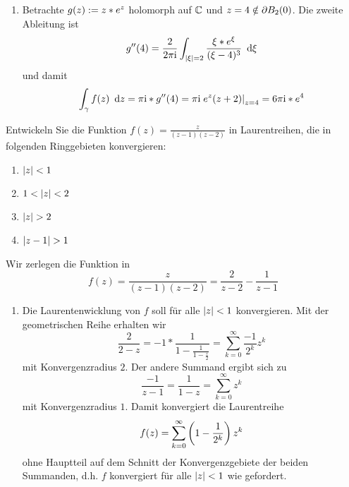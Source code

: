 \begin{exercisePage}
\begin{enumerate}[label=(zu \alph*), leftmargin=*]
		\item Betrachte $g(z) \mathrel{:=} z * e^z$ holomorph auf $\mathbb{C}$ und $z = 4 \notin \partial B_2(0)$. Die zweite Ableitung ist
		\begin{equation*}
			g''(4) = \frac{2}{2 \pi \mathrm{i}} \int_{\left| \xi \right| = 2} \frac{\xi * e^\xi}{(\xi - 4)^3} \enskip \mathrm{d}\xi 
		\end{equation*}
		und damit
		\begin{equation*}
			\int_\gamma f(z) \enskip \mathrm{d}z = \pi \mathrm{i} * g''(4) = \pi \mathrm{i} \left. e^z (z+2) \right\vert_{z = 4} = 6 \pi \mathrm{i} * e^4
		\end{equation*}
	\end{enumerate}

	\begin{task}
		Entwickeln Sie die Funktion $\displaystyle f(z) = \frac{z}{(z-1)(z-2)}$ in Laurentreihen, die in folgenden Ringgebieten konvergieren:
		\begin{enumerate}
			\item $\left| z \right| < 1$
			\item $1 < \left| z \right| < 2$
			\item $\left| z \right| > 2$
			\item $\left| z-1 \right| > 1$
		\end{enumerate}
	\end{task}

	Wir zerlegen die Funktion in
	\begin{equation*}
		f(z) = \frac{z}{(z-1)(z-2)} = \frac{2}{z-2} - \frac{1}{z-1}
	\end{equation*}
	
	\begin{enumerate}[label=(zu \alph*), leftmargin=*]
		\item Die Laurentenwicklung von $f$ soll für alle $\left| z \right| < 1$ konvergieren. Mit der geometrischen Reihe erhalten wir
		\begin{equation*}
			\frac{2}{2-z} = -1 * \frac{1}{1 - \frac{1}{1 - \frac{z}{2}}} = \sum_{k=0}^\infty \frac{-1}{2^k} z^k
		\end{equation*}
		mit Konvergenzradius $2$. Der andere Summand ergibt sich zu
		\begin{equation*}
			\frac{-1}{z-1} = \frac{1}{1-z} = \sum_{k=0}^\infty z^k
		\end{equation*}
		mit Konvergenzradius $1$. Damit konvergiert die Laurentreihe
		\begin{equation*}
			f(z) = \sum_{k=0}^\infty \left( 1 - \frac{1}{2^k} \right) z^k
		\end{equation*}
		ohne Hauptteil auf dem Schnitt der Konvergenzgebiete der beiden Summanden, d.h. $f$ konvergiert für alle $\left| z \right| < 1$ wie gefordert.
		

\end{enumerate}
\end{exercisePage}
